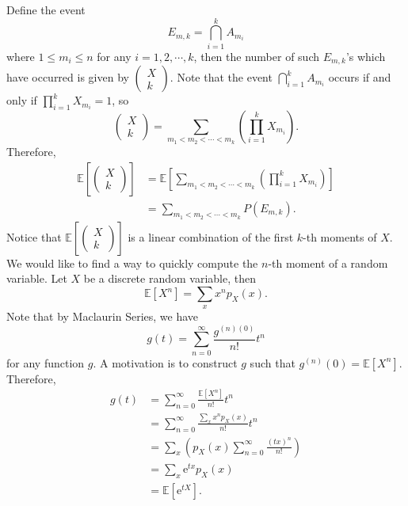 \documentclass[math]{amznotes}
\theoremstyle{remark}
\newcommand{\0}{\mathbf{0}}
\newcommand{\1}{\mathbf{1}}
\newcommand{\e}{\mathrm{e}}
\begin{document}
Define the event
\begin{equation*}
    E_{m, k} = \bigcap_{i = 1}^{k}A_{m_i}
\end{equation*}
where $1 \leq m_i \leq n$ for any $i = 1, 2, \cdots, k$, then the number of such $E_{m, k}$'s which have occurred is given by $\left(\begin{smallmatrix}
    X \\
    k
\end{smallmatrix}\right)$. Note that the event $\bigcap_{i = 1}^{k}A_{m_i}$ occurs if and only if $\prod_{i = 1}^{k}X_{m_i} = 1$, so
\begin{equation*}
    \begin{pmatrix}
        X \\
        k
    \end{pmatrix} = \sum_{m_1 < m_2 < \cdots < m_k}\left(\prod_{i = 1}^{k}X_{m_i}\right).
\end{equation*}
Therefore, 
\begin{align*}
    \mathbb{E}\left[\begin{pmatrix}
        X \\
        k
    \end{pmatrix}\right] & = \mathbb{E}\left[\sum_{m_1 < m_2 < \cdots < m_k}\left(\prod_{i = 1}^{k}X_{m_i}\right)\right] \\
    & = \sum_{m_1 < m_2 < \cdots < m_k}P\left(E_{m, k}\right).
\end{align*}
Notice that $\mathbb{E}\left[\left(\begin{smallmatrix}
    X \\
    k
\end{smallmatrix}\right)\right]$ is a linear combination of the first $k$-th moments of $X$. We would like to find a way to quickly compute the $n$-th moment of a random variable. Let $X$ be a discrete random variable, then 
\begin{equation*}
    \mathbb{E}\left[X^n\right] = \sum_{x}x^np_X(x).
\end{equation*}
Note that by Maclaurin Series, we have
\begin{equation*}
    g(t) = \sum_{n = 0}^{\infty}\frac{g^{(n)(0)}}{n!}t^n
\end{equation*}
for any function $g$. A motivation is to construct $g$ such that $g^{(n)}(0) = \mathbb{E}\left[X^n\right]$. Therefore,
\begin{align*}
    g(t) & = \sum_{n = 0}^{\infty}\frac{\mathbb{E}\left[X^n\right]}{n!}t^n \\
    & = \sum_{n = 0}^{\infty}\frac{\sum_{x}x^np_X(x)}{n!}t^n \\
    & = \sum_{x}\left(p_X(x)\sum_{n = 0}^{\infty}\frac{(tx)^n}{n!}\right) \\
    & = \sum_{x}\e^{tx}p_X(x) \\
    & = \mathbb{E}\left[\e^{tX}\right].
\end{align*}
\end{document}
